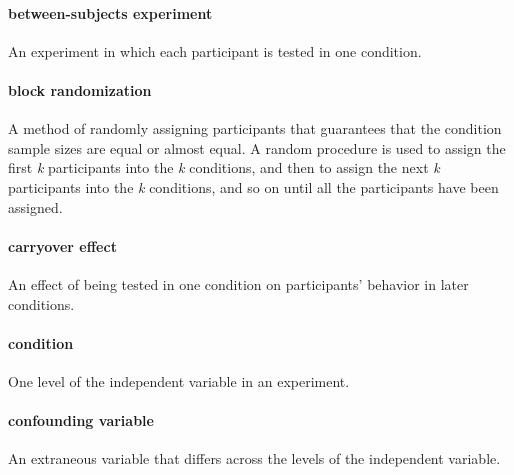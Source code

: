 \documentclass[
]{krantz}
\begin{document}
\hypertarget{between-subjects-experiment}{%
\paragraph*{between-subjects experiment}\label{between-subjects-experiment}}

An experiment in which each participant is tested in one condition.

\hypertarget{block-randomization}{%
\paragraph*{block randomization}\label{block-randomization}}

A method of randomly assigning participants that guarantees that the condition sample sizes are equal or almost equal. A random procedure is used to assign the first \emph{k} participants into the \emph{k} conditions, and then to assign the next \emph{k} participants into the \emph{k} conditions, and so on until all the participants have been assigned.

\hypertarget{carryover-effect}{%
\paragraph*{carryover effect}\label{carryover-effect}}

An effect of being tested in one condition on participants' behavior in later conditions.

\hypertarget{condition}{%
\paragraph*{condition}\label{condition}}

One level of the independent variable in an experiment.

\hypertarget{confounding-variable}{%
\paragraph*{confounding variable}\label{confounding-variable}}

An extraneous variable that differs across the levels of the independent variable.
\end{document}
